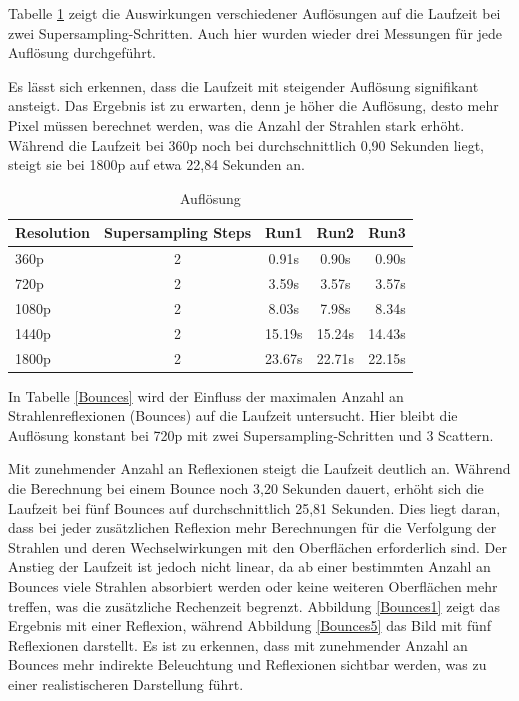 \documentclass[sigconf]{acmart}
\begin{document}
Tabelle \ref{Auflösung} zeigt die Auswirkungen verschiedener Auflösungen auf die Laufzeit bei zwei Supersampling-Schritten.
Auch hier wurden wieder drei Messungen für jede Auflösung durchgeführt.

Es lässt sich erkennen, dass die Laufzeit mit steigender Auflösung signifikant ansteigt.
Das Ergebnis ist zu erwarten, denn je höher die Auflösung, desto mehr Pixel müssen berechnet werden, was die Anzahl der Strahlen stark erhöht.
Während die Laufzeit bei 360p noch bei durchschnittlich 0,90 Sekunden liegt, steigt sie bei 1800p auf etwa 22,84 Sekunden an.
\begin{table}[t]
 \caption{Auflösung}

 \label{Auflösung}
 \centering
 \small
 \begin{tabular}[h]{lcccr}
  \toprule
  Resolution & Supersampling Steps & Run1 & Run2 & Run3\\
  \midrule
  360p & 2 & 0.91s & 0.90s & 0.90s\\
  720p & 2 & 3.59s & 3.57s & 3.57s\\
  1080p & 2 & 8.03s & 7.98s & 8.34s\\
  1440p & 2 & 15.19s & 15.24s & 14.43s\\
  1800p & 2 & 23.67s & 22.71s & 22.15s\\
  \bottomrule
 \end{tabular}
\end{table}

In Tabelle \ref{Bounces} wird der Einfluss der maximalen Anzahl an Strahlenreflexionen (Bounces) auf die Laufzeit untersucht.
Hier bleibt die Auflösung konstant bei 720p mit zwei Supersampling-Schritten und 3 Scattern.

Mit zunehmender Anzahl an Reflexionen steigt die Laufzeit deutlich an.
Während die Berechnung bei einem Bounce noch 3,20 Sekunden dauert, erhöht sich die Laufzeit bei fünf Bounces auf durchschnittlich 25,81 Sekunden.
Dies liegt daran, dass bei jeder zusätzlichen Reflexion mehr Berechnungen für die Verfolgung der Strahlen und deren Wechselwirkungen mit den Oberflächen erforderlich sind.
Der Anstieg der Laufzeit ist jedoch nicht linear, da ab einer bestimmten Anzahl an Bounces viele Strahlen absorbiert werden oder keine weiteren Oberflächen mehr treffen, was die zusätzliche Rechenzeit begrenzt.
Abbildung \ref{Bounces1} zeigt das Ergebnis mit einer Reflexion, während Abbildung \ref{Bounces5} das Bild mit fünf Reflexionen darstellt.
Es ist zu erkennen, dass mit zunehmender Anzahl an Bounces mehr indirekte Beleuchtung und Reflexionen sichtbar werden, was zu einer realistischeren Darstellung führt.
\end{document}
